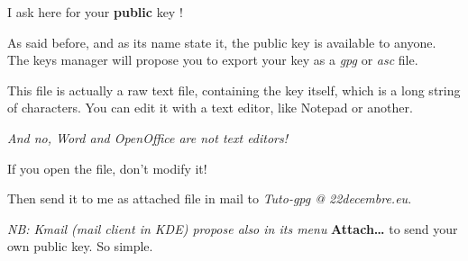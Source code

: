 I ask here for your \textbf{public} key !

As said before, and as its name state it, the public key is available to
anyone. The keys manager will propose you to export your key as a
\emph{gpg} or \emph{asc} file.

This file is actually a raw text file, containing the key itself, which
is a long string of characters. You can edit it with a text editor, like
Notepad or another.

\emph{And no, Word and OpenOffice are not text editors!}

\begin{warning}
	If you open the file, don't modify it!
\end{warning}

Then send it to me as attached file in mail to \emph{Tuto-gpg @ 22decembre.eu}.

\emph{NB: Kmail (mail client in KDE) propose also in its menu
}\textbf{Attach\ldots{}} to send your own public key. So simple.